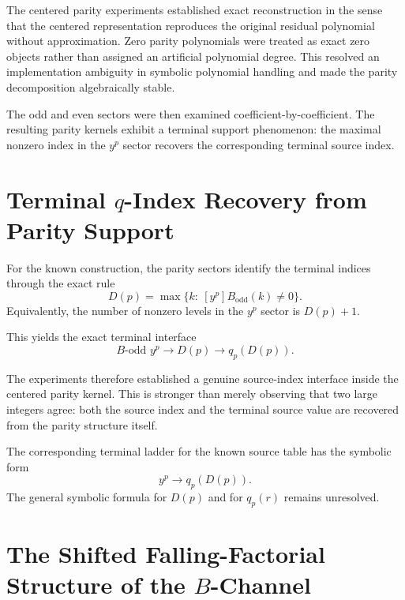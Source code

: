 \documentclass[11pt]{article}
\begin{document}
The centered parity experiments established exact reconstruction in the sense that the centered representation reproduces the original residual polynomial without approximation. Zero parity polynomials were treated as exact zero objects rather than assigned an artificial polynomial degree. This resolved an implementation ambiguity in symbolic polynomial handling and made the parity decomposition algebraically stable.

The odd and even sectors were then examined coefficient-by-coefficient. The resulting parity kernels exhibit a terminal support phenomenon: the maximal nonzero index in the $y^p$ sector recovers the corresponding terminal source index.

\section{Terminal $q$-Index Recovery from Parity Support}

For the known construction, the parity sectors identify the terminal indices through the exact rule
\begin{equation}
    D(p)=\max\{k:\ [y^p]B_{\mathrm{odd}}(k)\neq 0\}.
\end{equation}
Equivalently, the number of nonzero levels in the $y^p$ sector is $D(p)+1$.

This yields the exact terminal interface
\begin{equation}
    B\text{-odd }y^p
    \longrightarrow
    D(p)
    \longrightarrow
    q_p(D(p)).
\end{equation}

The experiments therefore established a genuine source-index interface inside the centered parity kernel. This is stronger than merely observing that two large integers agree: both the source index and the terminal source value are recovered from the parity structure itself.

The corresponding terminal ladder for the known source table has the symbolic form
\begin{equation}
    y^p
    \longrightarrow
    q_p(D(p)).
\end{equation}
The general symbolic formula for $D(p)$ and for $q_p(r)$ remains unresolved.

\section{The Shifted Falling-Factorial Structure of the $B$-Channel}
\end{document}
